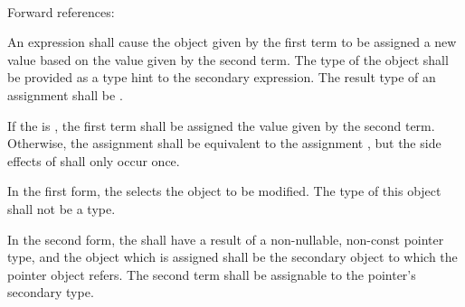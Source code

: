 
\begin{grammar}
 \\
	   \\
	\terminal{*}    \\
	 \terminal{=}  \\
	\terminal{(}  \terminal{)} \terminal{=}  \\

 \oneof \\
	\terminal{=}
	\terminal{+=}
	\terminal{-=}
	\terminal{*=}
	\terminal{/=}
	\terminal{\%=}
	\terminal{\textless{}\textless{}=}
	\terminal{\textgreater{}\textgreater{}=}
	\terminal{\&=}
	\terminal{|=}
	\terminal{\textasciicircum=}
	\terminal{\&\&=}
	\terminal{||=}
	\terminal{\textasciicircum\textasciicircum=}
\end{grammar}

Forward references: 

\specsubsubitem
An  expression shall cause the object given by the
first term to be assigned a new value based on the value given by the second
term. The type of the object shall be provided as a type hint to the secondary
expression. The result type of an assignment shall be .

\specsubsubitem
If the  is \terminal{=}, the first term shall be
assigned the value given by the second term. Otherwise, the assignment
 shall be
equivalent to the assignment
,
but the side effects of  shall only occur once.

\specsubsubitem
In the first form, the  selects the object to be
modified. The type of this object shall not be a  type.

\specsubsubitem
In the second form, the  shall have a result
of a non-nullable, non-const pointer type, and the object which is assigned
shall be the secondary object to which the pointer object refers. The second
term shall be assignable to the pointer's secondary type.

